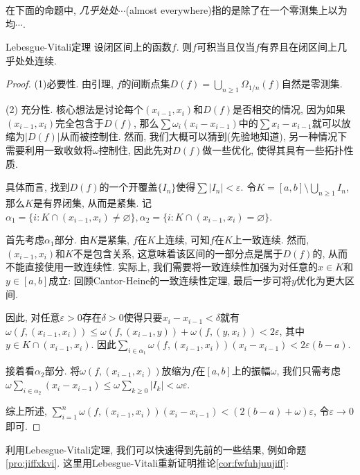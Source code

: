在下面的命题中, \textit{几乎处处$\cdots$}(almost everywhere)指的是除了在一个零测集上以为均$\cdots$. 

\begin{theorem}{Lebesgue-Vitali定理}
	设闭区间上的函数$f$. 则$f$可积当且仅当$f$有界且在闭区间上几乎处处连续. 
\end{theorem}
\begin{proof}
	(1)必要性. 由引理, $f$的间断点集$D(f)=\bigcup_{n\geq 1}\Omega _{1/n}(f)$自然是零测集. 
	
	(2) 充分性. 核心想法是讨论每个$(x_{i-1},x_i)$和$D(f)$是否相交的情况, 因为如果$(x_{i-1},x_i)$完全包含于$D(f)$, 那么$\sum \omega _i(x_i-x_{i-1})$中的$\sum x_i-x_{i-1}$就可以放缩为$|D(f)|$从而被控制住. 然而, 我们大概可以猜到(先验地知道), 另一种情况下需要利用一致收敛将$\omega$控制住, 因此先对$D(f)$做一些优化, 使得其具有一些拓扑性质. 
	
	具体而言, 找到$D(f)$的一个开覆盖$\{ I_n \}$使得$\sum |I_n|<\varepsilon$. 令$K=[a,b] \setminus \bigcup_{n\geq 1}I_n$, 那么$K$是有界闭集, 从而是紧集. 记$\alpha _1 =\{ i:K \cap (x_{i-1},x_i) \neq \varnothing \}, \alpha _2 =\{ i:K \cap (x_{i-1},x_i) = \varnothing \}$. 
	
	首先考虑$\alpha _1$部分. 由$K$是紧集, $f$在$K$上连续, 可知$f$在$K$上一致连续. 然而, $(x_{i-1},x_i)$和$K$不是包含关系, 这意味着该区间的一部分点是属于$D(f)$的, 从而不能直接使用一致连续性. 实际上, 我们需要将一致连续性加强为对任意的$x \in K$和$y \in [a,b]$成立: 回顾Cantor-Heine的一致连续性定理, 最后一步可将$y$优化为更大区间. 
	
	因此, 对任意$\varepsilon >0$存在$\delta >0$使得只要$x_i-x_{i-1}<\delta$就有$\omega (f,(x_{i-1},x_i)) \leq \omega (f,(x_{i-1},y)) + \omega (f,(y,x_i)) <2\varepsilon$, 其中$y \in K\cap (x_{i-1},x_i)$. 因此$\sum_{i \in \alpha _1} \omega (f,(x_{i-1},x_i))(x_i-x_{i-1}) < 2\varepsilon (b-a)$. 
	
	接着看$\alpha _2$部分. 将$\omega (f,(x_{i-1},x_i))$放缩为$f$在$[a,b]$上的振幅$\omega$, 我们只需考虑$\omega\sum_{i \in \alpha _2} (x_i-x_{i-1}) \leq \omega \sum_{k \geq 0} |I_k| < \omega \varepsilon$. 
	
	综上所述, $\sum_{i=1}^{n} \omega (f,(x_{i-1},x_i))(x_i-x_{i-1}) < (2(b-a)+\omega)\varepsilon$, 令$\varepsilon \to 0$即可. 
	
\end{proof}

利用Lebesgue-Vitali定理, 我们可以快速得到先前的一些结果, 例如命题\ref{pro:jiffxkvi}. 这里用Lebesgue-Vitali重新证明推论\ref{cor:fwfuhjuujiff}: 

